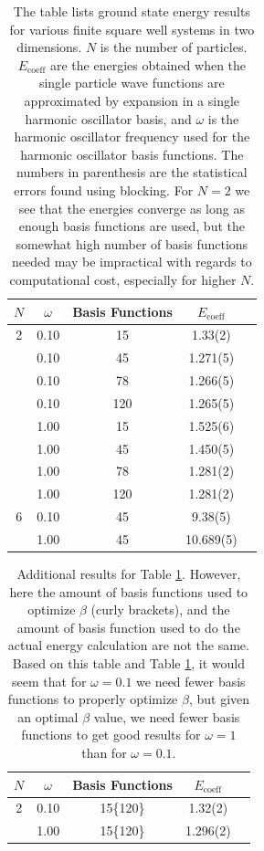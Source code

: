 \documentclass[../main.tex]{subfiles}
\begin{document}
\begin{table}[!ht]
  \centering
  \begin{tabular}{c c c c c}
    \hline
    \hline
    $N$ & $\omega$ & Basis Functions & $E_\textrm{coeff}$ \\*
    \hline
    2 & 0.10 & 15 & 1.33(2) \\*
      & 0.10 & 45 & 1.271(5) \\*
      & 0.10 & 78 & 1.266(5) \\*
      & 0.10 & 120 & 1.265(5) \\*
      & 1.00 & 15 & 1.525(6) \\*
      & 1.00 & 45 & 1.450(5) \\*
      & 1.00 & 78 & 1.281(2) \\*
      & 1.00 & 120 & 1.281(2) \vspace{2 mm}\\*
      
    6 & 0.10 & 45 & 9.38(5) \\* %
      & 1.00 & 45 & 10.689(5) \\*
    \hline
    \hline
  \end{tabular}
  \caption{The table lists ground state energy results for various finite square well systems in two dimensions. $N$ is the number of particles. $E_\textrm{coeff}$ are the energies obtained when the single particle wave functions are approximated by expansion in a single harmonic oscillator basis, and $\omega$ is the harmonic oscillator frequency used for the harmonic oscillator basis functions. The numbers in parenthesis are the statistical errors found using blocking. For $N=2$ we see that the energies converge as long as enough basis functions are used, but the somewhat high number of basis functions needed may be impractical with regards to computational cost, especially for higher $N$.}
  \label{tab: EnergiesFSW2D}
\end{table}

\begin{table}[!ht]
  \centering
  \begin{tabular}{c c c c c}
    \hline
    \hline
    $N$ & $\omega$ & Basis Functions & $E_\textrm{coeff}$ \\*
    \hline
    2 & 0.10 & 15\{120\} & 1.32(2) \\*
      & 1.00 & 15\{120\} & 1.296(2) \\*
    \hline
    \hline
  \end{tabular}
  \caption{Additional results for Table \ref{tab: EnergiesFSW2D}. However, here the amount of basis functions used to optimize $\beta$ (curly brackets), and the amount of basis function used to do the actual energy calculation are not the same. Based on this table and Table \ref{tab: EnergiesFSW2D}, it would seem that for $\omega=0.1$ we need fewer basis functions to properly optimize $\beta$, but given an optimal $\beta$ value, we need fewer basis functions to get good results for $\omega = 1$ than for $\omega = 0.1$.}
  \label{tab: EnergiesFSW2D_v2}
\end{table}
\end{document}

